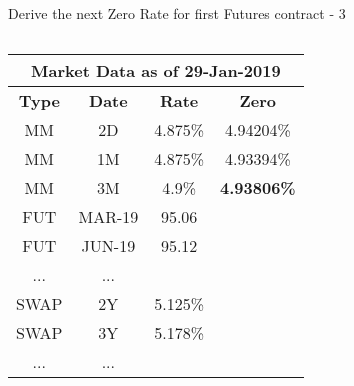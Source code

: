 \documentclass[handout, aspectratio=169]{beamer}
\begin{document}
\begin{frame}{Derive the next Zero Rate for first Futures contract - 3}
	\begin{columns}[T]
		\begin{column}{0.4\textwidth}
			\begin{table}[t]
				\centering
				\begin{adjustbox}{max width=\textwidth, max height=\textheight}
					\begin{tabular}{|c|c|c|c|} 
						\hline
						\multicolumn{4}{|c|}{\textbf{Market Data as of 29-Jan-2019}} \\
						\hline
						\textbf{Type} & \textbf{Date}  & \textbf{Rate} & \textbf{Zero}\\				
						\hline
						MM & 2D & 4.875\% & 4.94204\% \\
						MM & 1M & 4.875\% & 4.93394\% \\
						MM & 3M & 4.9\% & \textbf{4.93806\%}\\
						\hline
						FUT & MAR-19 & 95.06 &\\
						FUT & JUN-19 & 95.12 &\\
						... & ... & &\\
						\hline
						SWAP & 2Y & 5.125\% &\\
						SWAP & 3Y & 5.178\% &\\
						... & ... & &\\
						\hline
					\end{tabular}
				\end{adjustbox}
			\end{table}
		\end{column}
		

\end{columns}
\end{frame}
\end{document}
